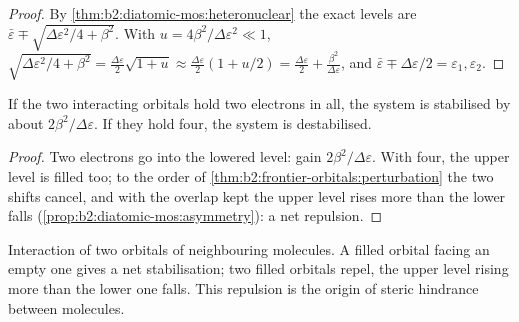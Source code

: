 \begin{proof}
By \cref{thm:b2:diatomic-mos:heteronuclear} the exact levels are $\bar\varepsilon \mp
\sqrt{\Delta\varepsilon^2/4 + \beta^2}$. With $u = 4\beta^2/\Delta\varepsilon^2 \ll 1$, $\sqrt{\Delta\varepsilon^2/4
+ \beta^2} = \frac{\Delta\varepsilon}{2}\sqrt{1 + u} \approx \frac{\Delta\varepsilon}{2}(1 + u/2) =
\frac{\Delta\varepsilon}{2} + \frac{\beta^2}{\Delta\varepsilon}$, and $\bar\varepsilon \mp \Delta\varepsilon/2 = \varepsilon_1,
\varepsilon_2$.
\end{proof}

\begin{proposition}\label{prop:b2:frontier-orbitals:four-electron}
If the two interacting orbitals hold two electrons in all, the system is stabilised
by about $2\beta^2/\Delta\varepsilon$. If they hold four, the system is destabilised.
\end{proposition}

\begin{proof}
Two electrons go into the lowered level: gain $2\beta^2/\Delta\varepsilon$. With four, the upper level
is filled too; to the order of \cref{thm:b2:frontier-orbitals:perturbation} the two
shifts cancel, and with the overlap kept the upper level rises more than the lower
falls (\cref{prop:b2:diatomic-mos:asymmetry}): a net repulsion.
\end{proof}

\begin{omfigure}

{\small Interaction of two orbitals of neighbouring molecules. A filled orbital
facing an empty one gives a net stabilisation; two filled orbitals repel, the
upper level rising more than the lower one falls. This repulsion is the origin
of steric hindrance between molecules.}
\end{omfigure}

